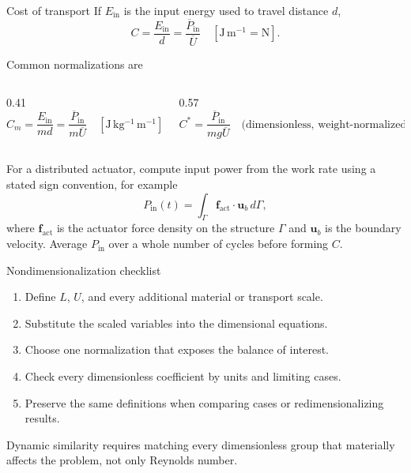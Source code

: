 \documentclass[aspectratio=169,11pt]{beamer}
\newcommand{\uvec}{\bm{u}}
\begin{document}
\begin{frame}{Cost of transport}
\small
If $E_{\mathrm{in}}$ is the input energy used to travel distance $d$,
\[
  C=\frac{E_{\mathrm{in}}}{d}
  =\frac{\overline{P}_{\mathrm{in}}}{\overline{U}}
  \quad [\mathrm{J\,m^{-1}}=\mathrm{N}].
\]

Common normalizations are
\begin{columns}[T,onlytextwidth]
\begin{column}{0.41\textwidth}
\[
  C_m=\frac{E_{\mathrm{in}}}{m d}
  =\frac{\overline{P}_{\mathrm{in}}}{m\overline{U}}
  \quad [\mathrm{J\,kg^{-1}\,m^{-1}}],
\]
\end{column}
\begin{column}{0.57\textwidth}
\[
  C^*=\frac{\overline{P}_{\mathrm{in}}}{m g\overline{U}}
  \quad \text{(dimensionless, weight-normalized)}.
\]
\end{column}
\end{columns}

For a distributed actuator, compute input power from the work rate using a stated sign convention, for example
\[
  P_{\mathrm{in}}(t)=\int_{\Gamma}\bm{f}_{\mathrm{act}}\cdot\uvec_b\,d\Gamma,
\]
where $\bm{f}_{\mathrm{act}}$ is the actuator force density on the structure $\Gamma$ and $\uvec_b$ is the boundary velocity. Average $P_{\mathrm{in}}$ over a whole number of cycles before forming $C$.

\end{frame}

\begin{frame}{Nondimensionalization checklist}
\begin{enumerate}\itemsep8pt
  \item Define $L$, $U$, and every additional material or transport scale.
  \item Substitute the scaled variables into the dimensional equations.
  \item Choose one normalization that exposes the balance of interest.
  \item Check every dimensionless coefficient by units and limiting cases.
  \item Preserve the same definitions when comparing cases or redimensionalizing results.
\end{enumerate}
\begin{punchbox}
\centering
\small Dynamic similarity requires matching every dimensionless group that materially affects the problem, not only Reynolds number.
\end{punchbox}
\end{frame}
\end{document}
